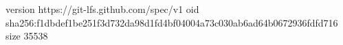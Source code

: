 version https://git-lfs.github.com/spec/v1
oid sha256:f1dbdef1be251f3d732da98d1fd4bf04004a73c030ab6ad64b0672936fdfd716
size 35538
